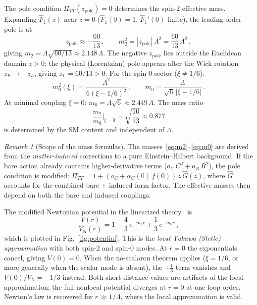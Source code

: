 \documentclass[aps,prd,twocolumn,superscriptaddress,nofootinbib,floatfix]{revtex4-2}
\theoremstyle{definition}
\theoremstyle{remark}
\newtheorem{remark}[theorem]{Remark}
\begin{document}
The pole condition $\Pi_{TT}(z_{\text{pole}}) = 0$ determines the
spin-2 effective mass. Expanding $\hat{F}_1(z)$ near $z = 0$
($\hat{F}_1(0) = 1$, $\hat{F}_1'(0)$ finite), the leading-order pole is at
\begin{equation}
  z_{\text{pole}} \approx -\frac{60}{13}\,,\qquad
  m_2^2 = |z_{\text{pole}}|\,\Lambda^2 = \frac{60}{13}\,\Lambda^2\,,
  \label{eq:m2}
\end{equation}
giving $m_2 = \Lambda\sqrt{60/13} \approx 2.148\,\Lambda$. The negative
$z_{\text{pole}}$ lies outside the Euclidean domain $z > 0$; the physical
(Lorentzian) pole appears after the Wick rotation
$z_E \to -z_L$, giving $z_L = 60/13 > 0$. For the spin-0
sector ($\xi \neq 1/6$):
\begin{equation}
  m_0^2(\xi) = \frac{\Lambda^2}{6(\xi - 1/6)^2}\,,\qquad
  m_0 = \frac{\Lambda}{\sqrt{6}\,|\xi - 1/6|}\,.
  \label{eq:m0}
\end{equation}
At minimal coupling $\xi = 0$: $m_0 = \Lambda\sqrt{6} \approx 2.449\,
\Lambda$. The mass ratio
\begin{equation}
  \frac{m_2}{m_0}\bigg|_{\xi=0} = \sqrt{\frac{10}{13}} \approx 0.877
  \label{eq:mass-ratio}
\end{equation}
is determined by the SM content and independent of $\Lambda$.

\begin{remark}[Scope of the mass formulas]
The masses~\eqref{eq:m2}--\eqref{eq:m0} are derived from the
\emph{matter-induced} corrections to a pure Einstein--Hilbert background. If
the bare action already contains higher-derivative terms ($a_C\,C^2 +
a_R\,R^2$), the pole condition is modified:
$\Pi_{TT} = 1 + (a_C + \alpha_C(0)\,f(0))\,z\,\hat{G}(z)$, where
$\hat{G}$ accounts for the combined bare + induced form factor. The
effective masses then depend on both the bare and induced couplings.
\end{remark}

The modified Newtonian potential in the linearized
theory~\cite{Stelle:1976gc} is
\begin{equation}
  \frac{V(r)}{V_{\text{N}}(r)}
  = 1 - \frac{4}{3}\,e^{-m_2 r} + \frac{1}{3}\,e^{-m_0 r}\,,
  \label{eq:V-ratio}
\end{equation}
which is plotted in Fig.~\ref{fig:potential}. This is the
\emph{local Yukawa (Stelle) approximation} with both spin-2 and spin-0
modes.  At $r = 0$ the exponentials cancel, giving $V(0) = 0$.
When the no-scalaron theorem applies ($\xi = 1/6$, or
more generally when the scalar mode is absent), the $+\frac{1}{3}$
term vanishes and $V(0)/V_\mathrm{N} = -1/3$ instead.
Both short-distance values are artifacts of the local approximation;
the full nonlocal potential diverges at $r = 0$ at one-loop order.
Newton's law is recovered for $r \gg 1/\Lambda$, where the local
approximation is valid.
\end{document}
